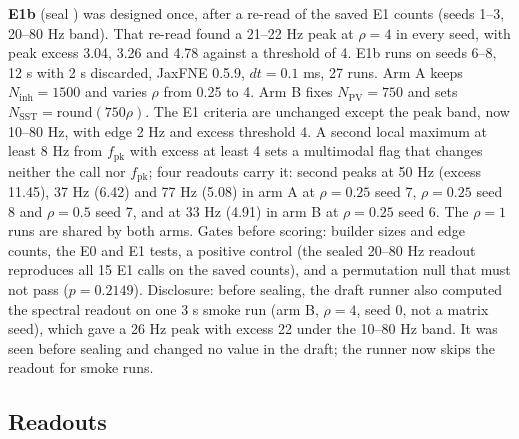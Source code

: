 \textbf{E1b} (seal ) was designed once, after a re-read of the saved E1 counts (seeds 1--3, 20--80 Hz band). That
re-read found a 21--22 Hz peak at $\rho = 4$ in every seed, with peak excess 3.04, 3.26 and 4.78 against a threshold of
4. E1b runs on seeds 6--8, 12 s with 2 s discarded, JaxFNE 0.5.9, $dt = 0.1$ ms, 27 runs. Arm A keeps $N_\text{inh} = 1500$
and varies $\rho$ from 0.25 to 4. Arm B fixes $N_\text{PV} = 750$ and sets $N_\text{SST} = \text{round}(750\rho)$. The E1
criteria are unchanged except the peak band, now 10--80 Hz, with edge 2 Hz and excess threshold 4. A second local maximum at least 8 Hz from $f_\text{pk}$ with excess at least 4 sets a multimodal flag that changes neither the call nor $f_\text{pk}$; four readouts carry it: second peaks at 50 Hz (excess 11.45), 37 Hz (6.42) and 77 Hz (5.08) in arm A at $\rho = 0.25$ seed 7, $\rho = 0.25$ seed 8 and $\rho = 0.5$ seed 7, and at 33 Hz (4.91) in arm B at $\rho = 0.25$ seed 6. The $\rho = 1$ runs are
shared by both arms. Gates before scoring: builder sizes and edge counts, the E0 and E1 tests, a positive control (the
sealed 20--80 Hz readout reproduces all 15 E1 calls on the saved counts), and a permutation null that must not pass
($p = 0.2149$). Disclosure: before sealing, the draft runner also computed the spectral readout on one 3 s smoke run (arm B, $\rho = 4$, seed 0, not a matrix seed), which gave a 26 Hz peak with excess 22 under the 10--80 Hz band. It was seen before sealing and changed no value in the draft; the runner now skips the readout for smoke runs.

\subsection{Readouts}


